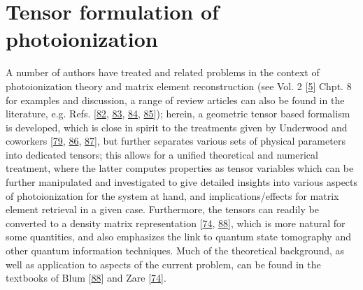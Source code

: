 \documentclass[letterpaper,table,10pt,english]{jupyterBook}
\begin{document}
\section{Tensor formulation of photoionization}
\label{\detokenize{part1/theory_tensor_formalism_160723:tensor-formulation-of-photoionization}}\label{\detokenize{part1/theory_tensor_formalism_160723:sec-tensor-formulation}}\label{\detokenize{part1/theory_tensor_formalism_160723::doc}}
\sphinxAtStartPar
A number of authors have treated {\hyperref[\detokenize{backmatter/glossary:term-PADs}]{}} and related problems in the context of photoionization theory and matrix element reconstruction (see  Vol. 2 {[}\hyperlink{cite.backmatter/bibliography:id664}{5}{]} Chpt. 8 for examples and discussion, a range of review articles can also be found in the literature, e.g. Refs. {[}\hyperlink{cite.backmatter/bibliography:id514}{82}, \hyperlink{cite.backmatter/bibliography:id822}{83}, \hyperlink{cite.backmatter/bibliography:id707}{84}, \hyperlink{cite.backmatter/bibliography:id708}{85}{]}); herein, a geometric tensor based formalism is developed, which is close in spirit to the treatments given by Underwood and co\sphinxhyphen{}workers {[}\hyperlink{cite.backmatter/bibliography:id886}{79}, \hyperlink{cite.backmatter/bibliography:id821}{86}, \hyperlink{cite.backmatter/bibliography:id916}{87}{]}, but further separates various sets of physical parameters into dedicated tensors; this allows for a unified theoretical and numerical treatment, where the latter computes properties as tensor variables which can be further manipulated and investigated to give detailed insights into various aspects of photoionization for the system at hand, and implications/effects for matrix element retrieval in a given case. Furthermore, the tensors can readily be converted to a density matrix representation {[}\hyperlink{cite.backmatter/bibliography:id968}{74}, \hyperlink{cite.backmatter/bibliography:id525}{88}{]}, which is more natural for some quantities, and also emphasizes the link to quantum state tomography and other quantum information techniques. Much of the theoretical background, as well as application to aspects of the current problem, can be found in the textbooks of Blum {[}\hyperlink{cite.backmatter/bibliography:id525}{88}{]} and Zare {[}\hyperlink{cite.backmatter/bibliography:id968}{74}{]}.
\end{document}

